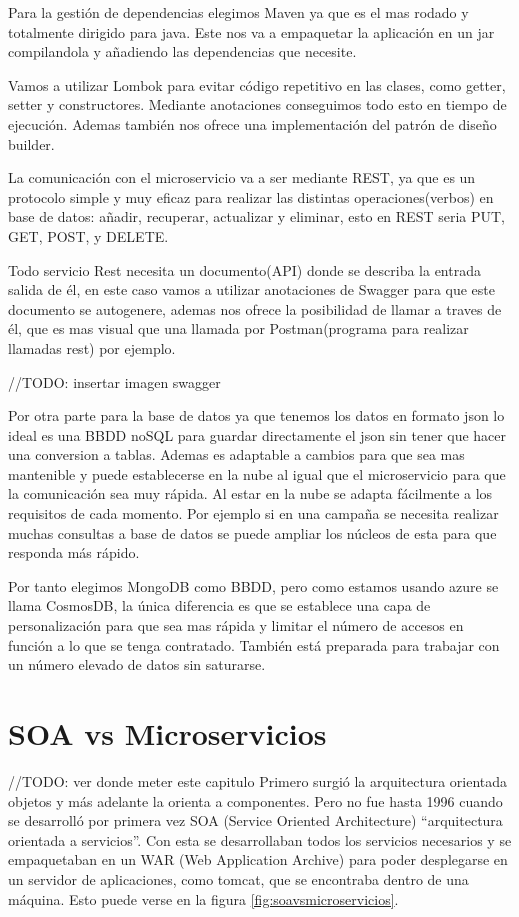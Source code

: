\documentclass[12pt]{report} %
\begin{document}
Para la gestión de dependencias elegimos Maven ya que es el mas rodado y totalmente dirigido para java. Este nos va a empaquetar la aplicación en un jar compilandola y añadiendo las dependencias que necesite.

Vamos a utilizar Lombok para evitar código repetitivo en las clases, como getter, setter y constructores. Mediante anotaciones conseguimos todo esto en tiempo de ejecución. Ademas también nos ofrece una implementación del patrón de diseño builder.

La comunicación con el microservicio va a ser mediante REST, ya que es un protocolo simple y muy eficaz para realizar las distintas operaciones(verbos) en base de datos: añadir, recuperar, actualizar y eliminar, esto en REST seria PUT, GET, POST, y DELETE.

Todo servicio Rest necesita un documento(API) donde se describa la entrada salida de él, en este caso vamos a utilizar anotaciones de Swagger para que este documento se autogenere, ademas nos ofrece la posibilidad de llamar a traves de él, que es mas visual que una llamada por Postman(programa para realizar llamadas rest) por ejemplo.

//TODO: insertar imagen swagger

Por otra parte para la base de datos ya que tenemos los datos en formato json lo ideal es una BBDD noSQL para guardar directamente el json sin tener que hacer una conversion a tablas. Ademas es adaptable a cambios para que sea mas mantenible y puede establecerse en la nube al igual que el microservicio para que la comunicación sea muy rápida. Al estar en la nube se adapta fácilmente a los requisitos de cada momento. Por ejemplo si en una campaña se necesita realizar muchas consultas a base de datos se puede ampliar los núcleos de esta para que responda más rápido.

Por tanto elegimos MongoDB como BBDD, pero como estamos usando azure se llama CosmosDB, la única diferencia es que se establece una capa de personalización para que sea mas rápida y limitar el número de accesos en función a lo que se tenga contratado. También está preparada para trabajar con un número elevado de datos sin saturarse.

\chapter{SOA vs Microservicios}
//TODO: ver donde meter este capitulo
Primero surgió la arquitectura orientada objetos y más adelante la orienta a componentes. Pero no fue hasta 1996 cuando se desarrolló por primera vez SOA (Service Oriented Architecture) “arquitectura orientada a servicios”. Con esta se desarrollaban todos los servicios necesarios y se empaquetaban en un WAR (Web Application Archive) para poder desplegarse en un servidor de aplicaciones, como tomcat, que se encontraba dentro de una máquina. Esto puede verse en la figura \ref{fig:soavsmicroservicios}.
\end{document}
